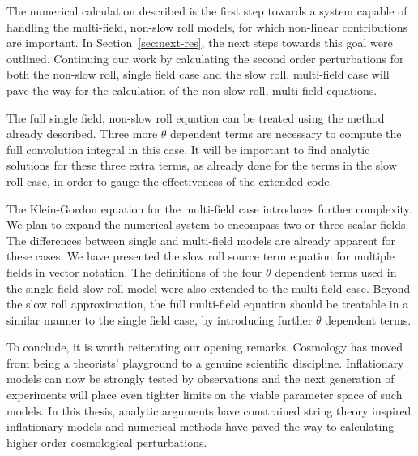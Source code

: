 The numerical calculation described is the first step towards a system capable of
handling the multi-field, non-slow roll models, for which non-linear contributions
are important. In Section~\ref{sec:next-res}, the next steps towards this goal were
outlined. 
% 
Continuing our work by calculating the second order perturbations for both the
non-slow roll, single field case and the slow
roll, multi-field case will pave the way for the calculation of the
non-slow roll, multi-field equations.
% 

The full single field, non-slow roll equation can be treated using the
method already described. 
Three more $\theta$ dependent terms are necessary to
compute the full convolution integral in this case. It will be important to find
analytic solutions for these three extra terms, as already done for the terms in the
slow roll case, in
order to gauge the effectiveness of the extended code.

The Klein-Gordon equation for the multi-field case introduces further complexity. We plan to
expand the numerical system to encompass two or three scalar fields. The differences
between single and multi-field models are already apparent for these cases. We have
presented the slow roll source term equation for multiple fields in vector notation.
The definitions of the four $\theta$ dependent terms used in the single
field slow roll model were also extended to the multi-field case. Beyond the slow
roll approximation, the full multi-field equation should be treatable in a similar
manner to the single field case, by introducing further $\theta$ dependent terms.



To conclude, it is worth reiterating our opening remarks. Cosmology has moved from
being a theorists' playground to a genuine scientific discipline. Inflationary models can
now be strongly tested by observations and the next generation of experiments will
place even tighter limits on the viable parameter space of such models. In this thesis, analytic
arguments have constrained string theory inspired inflationary models and numerical
methods have paved the way to calculating higher order cosmological perturbations.